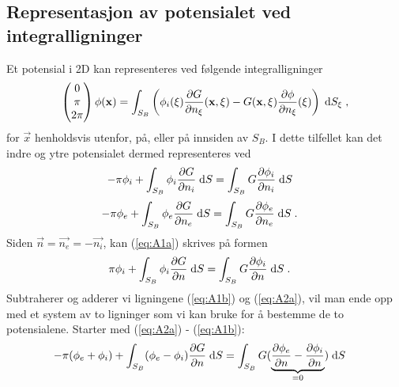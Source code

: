 \documentclass[a4paper,norsk]{article}
\begin{document}

\subsection*{Representasjon av potensialet ved integralligninger}
\noindent Et potensial i 2D kan representeres ved følgende integralligninger
\begin{align*}
  \begin{pmatrix}
  0 \\ \pi \\ 2\pi
  \end{pmatrix}\phi(\mathbf{x}) = \int_{S_B}\left(\phi_i(\mathbf{\xi})
           \frac{\partial G}{\partial n_\xi}(\mathbf{x}, \mathbf{\xi})
       - G(\mathbf{x}, \mathbf{\xi})\frac{\partial \phi}{\partial n_\xi}(\mathbf{\xi})\right)\;\mathrm{d} S_\xi\;,
\end{align*}
for $\vec{x}$ henholdsvis utenfor, på, eller på innsiden av $S_B$. I dette
tilfellet kan det indre og ytre potensialet dermed representeres ved
\begin{align}\label{eq:A1a}
  -\pi\phi_i + \int_{S_B}\phi_i \frac{\partial G}{\partial n_i}\;\mathrm{d} S
                  &= \int_{S_B}G\frac{\partial \phi_i}{\partial n_i}\;\mathrm{d} S
\end{align}
\begin{align}\label{eq:A2a}
  -\pi\phi_e + \int_{S_B}\phi_e \frac{\partial G}{\partial n_e}\;\mathrm{d} S
                  &= \int_{S_B}G\frac{\partial \phi_e}{\partial n_e}\;\mathrm{d} S \;.
\end{align}
Siden $\vec{n} = \vec{n_e} = -\vec{n_i}$, kan (\ref{eq:A1a}) skrives på formen
\begin{align}\label{eq:A1b}
  \pi\phi_i + \int_{S_B}\phi_i \frac{\partial G}{\partial n}\;\mathrm{d} S
                  &= \int_{S_B}G\frac{\partial \phi_i}{\partial n}\;\mathrm{d} S \;.
\end{align}
Subtraherer og adderer vi ligningene (\ref{eq:A1b}) og (\ref{eq:A2a}), vil man ende
opp med et system av to ligninger som vi kan bruke for å bestemme de to
potensialene. Starter med (\ref{eq:A2a}) - (\ref{eq:A1b}):
\begin{align}\label{eq:A3a}
  -\pi(\phi_e + \phi_i) + \int_{S_B} (\phi_e-\phi_i) \frac{\partial G}{\partial n}\;\mathrm{d} S
                  &= \int_{S_B}G( \underbrace{\frac{\partial \phi_e}{\partial n} -
                       \frac{\partial \phi_i}{\partial n}}_{=0}) \;\mathrm{d} S
\end{align}
\end{document}
